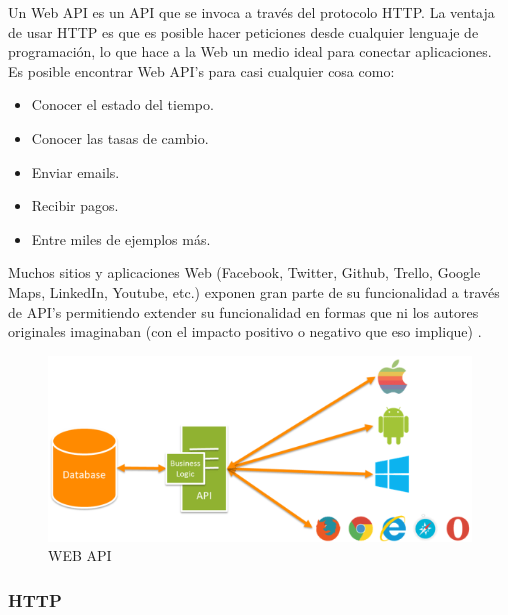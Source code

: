 		{Un Web API es un API que se invoca a través del protocolo HTTP. La ventaja de usar HTTP es que es posible hacer peticiones desde cualquier lenguaje de programación, lo que hace a la Web un medio ideal para conectar aplicaciones.\\
			
		Es posible encontrar Web API’s para casi cualquier cosa como: 
		
		\begin{itemize}
			\item Conocer el estado del tiempo.
			\item Conocer las tasas de cambio.
			\item Enviar emails.
			\item Recibir pagos.
			\item Entre miles de ejemplos más.
		\end{itemize}
			
		Muchos sitios y aplicaciones Web (Facebook, Twitter, Github, Trello, Google Maps, LinkedIn, Youtube, etc.) exponen gran parte de su funcionalidad a través de API’s permitiendo extender su funcionalidad en formas que ni los autores originales imaginaban (con el impacto positivo o negativo que eso implique) \cite{webapi}.
		
		\begin{figure}[H]
			\centering
			\includegraphics[width=0.8\linewidth]{description/framework/webapi.png}
			\caption{WEB API}
		\end{figure}
		}
		
		
		\subsubsection{HTTP}
		
